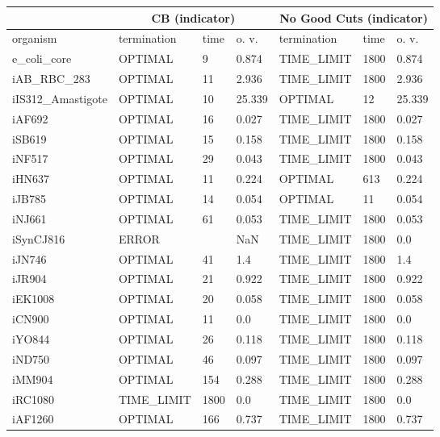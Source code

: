 \begin{table}[!ht]
    \centering
    \begin{tabular}{|l|l|l|l|l|l|l|}
    \hline
        \multicolumn{1}{|c}{} & \multicolumn{3}{|c|}{CB (indicator)} & \multicolumn{3}{c|}{No Good Cuts (indicator)}\\ \hline 
        organism & termination & time & o. v. & termination & time & o. v. \\ \hline
        e\_coli\_core & OPTIMAL & 9 & 0.874 & TIME\_LIMIT & 1800 & 0.874 \\ \hline
        iAB\_RBC\_283 & OPTIMAL & 11 & 2.936 & TIME\_LIMIT & 1800 & 2.936 \\ \hline
        iIS312\_Amastigote & OPTIMAL & 10 & 25.339 & OPTIMAL & 12 & 25.339 \\ \hline
        iAF692 & OPTIMAL & 16 & 0.027 & TIME\_LIMIT & 1800 & 0.027 \\ \hline
        iSB619 & OPTIMAL & 15 & 0.158 & TIME\_LIMIT & 1800 & 0.158 \\ \hline
        iNF517 & OPTIMAL & 29 & 0.043 & TIME\_LIMIT & 1800 & 0.043 \\ \hline
        iHN637 & OPTIMAL & 11 & 0.224 & OPTIMAL & 613 & 0.224 \\ \hline
        iJB785 & OPTIMAL & 14 & 0.054 & OPTIMAL & 11 & 0.054 \\ \hline
        iNJ661 & OPTIMAL & 61 & 0.053 & TIME\_LIMIT & 1800 & 0.053 \\ \hline
        iSynCJ816 & ERROR & ~ & NaN & TIME\_LIMIT & 1800 & 0.0 \\ \hline
        iJN746 & OPTIMAL & 41 & 1.4 & TIME\_LIMIT & 1800 & 1.4 \\ \hline
        iJR904 & OPTIMAL & 21 & 0.922 & TIME\_LIMIT & 1800 & 0.922 \\ \hline
        iEK1008 & OPTIMAL & 20 & 0.058 & TIME\_LIMIT & 1800 & 0.058 \\ \hline
        iCN900 & OPTIMAL & 11 & 0.0 & TIME\_LIMIT & 1800 & 0.0 \\ \hline
        iYO844 & OPTIMAL & 26 & 0.118 & TIME\_LIMIT & 1800 & 0.118 \\ \hline
        iND750 & OPTIMAL & 46 & 0.097 & TIME\_LIMIT & 1800 & 0.097 \\ \hline
        iMM904 & OPTIMAL & 154 & 0.288 & TIME\_LIMIT & 1800 & 0.288 \\ \hline
        iRC1080 & TIME\_LIMIT & 1800 & 0.0 & TIME\_LIMIT & 1800 & 0.0 \\ \hline
        iAF1260 & OPTIMAL & 166 & 0.737 & TIME\_LIMIT & 1800 & 0.737 \\ \hline

\end{tabular}
\end{table}
